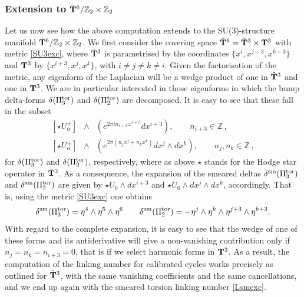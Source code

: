 \documentclass[11pt]{article}
\def\a {\alpha}
\def\be{\begin{equation}}
\def\ee{\end{equation}}
\def\bea{\begin{eqnarray}}
\def\eea{\end{eqnarray}}
\newcommand{\IZ}{\mathbb{Z}}
\begin{document}
\subsubsection*{Extension to $\tilde{\bf T}^6/\IZ_2 \times \IZ_2$}

Let us now see how the above computation extends to the SU(3)-structure manifold $\tilde{\bf T}^6/\IZ_2 \times \IZ_2$. We first consider the covering space  $\tilde{\bf T}^6 = \tilde{\bf T}^3 \times {\bf T}^3$ with metric \eqref{SU3exc}, where $\tilde{\bf T}^3$ is parametrised by the coordinates $\{x^i, x^{j+3}, x^{k+3}\}$ and $ {\bf T}^3$ by $\{x^{i+3}, x^j, x^k\}$,  with $i \neq j\neq k \neq i$. Given the factorisation of the metric,  any eigenform of the Laplacian will be a wedge product of one in $\tilde{\bf T}^3$ and one in $ {\bf T}^3$. We are in particular interested in those eigenforms in which the bump delta-forms $\delta(\Pi_3^{\rm tor})$ and $\delta(\Pi_2^{\rm tor})$ are decomposed. It is easy to see that these fall in the subset
\bea
\left[ \star U_\a^\pm\right] & \wedge & \left(e^{2 \pi i n_{i+3} \, x^{i+3}}dx^{i+3}\right), \qquad n_{i+3} \in \IZ\, , \\
\left[ \star U_\a^\pm\right]  & \wedge & \left(e^{2 \pi (n_j  x^j+ n_k x^k)} dx^j \wedge dx^k \right), \qquad n_j, n_k \in \IZ\, ,
\eea
for  $\delta(\Pi_3^{\rm tor})$ and $\delta(\Pi_2^{\rm tor})$, respectively, where as above $\star$ stands for the Hodge star operator in $\tilde{\bf T}^3$. As a consequence,  the expansion of the smeared deltas $\delta^{\rm{sm}}(\Pi_3^{\rm tor})$ and $\delta^{\rm{sm}}(\Pi_2^{\rm tor})$ are given by $\star U_0\wedge dx^{i+3} $ and $\star U_0\wedge dx^{j}\wedge dx^k$, accordingly. That is, using the metric \eqref{SU3exc} one obtains
\be
  \delta^{\rm{sm}}(\Pi_3^{\rm tor}) = \eta^{4} \wedge \eta^{5} \wedge \eta^{6}  %
  \qquad
   \delta^{\rm{sm}}(\Pi_2^{\rm tor}) = -\eta^{j}\wedge \eta^{k}\wedge \eta^{j+3}\wedge \eta^{k+3}. \label{deltasmT6}
\ee
With regard to the complete expansion, it is easy to see that the wedge of one of these forms and its antiderivative will give a non-vanishing contribution only if $n_j = n_k = n_{i+3} =0$, that is if we select harmonic forms in ${\bf T}^3$. As a result, the computation of the linking number for calibrated cycles works precisely as outlined for $\tilde{\bf T}^3$, with the same vanishing coefficients and the same cancellations, and we end up again with the smeared torsion linking number \eqref{Lsmexc}. 
\end{document}
